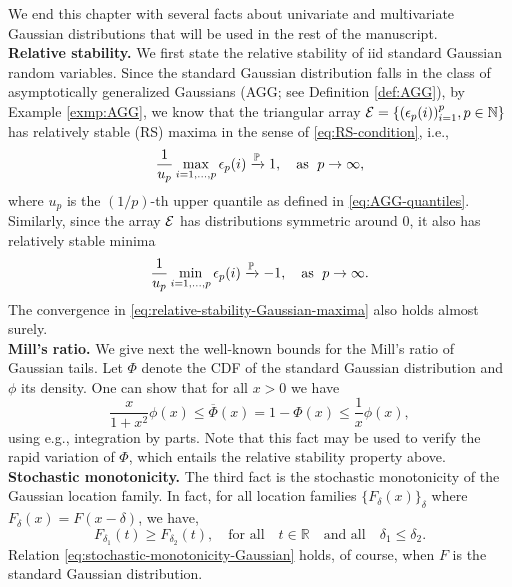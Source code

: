 
We end this chapter with several facts about univariate and multivariate Gaussian distributions that will be used in the rest of the manuscript. \\

{\bf Relative stability.} We first state the relative stability of iid standard Gaussian random variables.  Since the standard Gaussian distribution falls in the 
class of asymptotically generalized Gaussians (AGG; see Definition \ref{def:AGG}), by Example \ref{exmp:AGG}, we know that the triangular array ${\cal E} = \{(\epsilon_p(i))_{i=1}^p, p\in\N\}$ has relatively stable (RS) maxima in the sense of \eqref{eq:RS-condition}, i.e.,
\begin{equation} \label{eq:relative-stability-Gaussian-maxima}
    \frac{1}{u_{p}} \max_{i=1,\ldots,p} \epsilon_p(i) \xrightarrow{\P} 1,\quad \text{as }\;p\to\infty,
\end{equation}
where $u_p$ is the $(1/p)$-th upper quantile as defined in \eqref{eq:AGG-quantiles}.
Similarly, since the array ${\cal E}$ has distributions symmetric around 0, it also has relatively stable minima
\begin{equation} \label{eq:relative-stability-Gaussian-minima}
    \frac{1}{u_{p}} \min_{i=1,\ldots,p} \epsilon_p(i) \xrightarrow{\P} -1,\quad \text{as }\;p\to\infty.
\end{equation}
The convergence in \eqref{eq:relative-stability-Gaussian-maxima} also holds almost surely.\\

{\bf Mill's ratio.} We give next the well-known bounds for the Mill's ratio of Gaussian tails.
Let $\Phi$ denote the CDF of the standard Gaussian distribution and $\phi$ its density.
One can show that for all $x>0$ we have
\begin{equation} \label{eq:Mills-ratio}
    \frac{x}{1+x^2}\phi(x) \le \overline{\Phi}(x) = 1-\Phi(x) \le \frac{1}{x}\phi(x),
\end{equation}
using e.g., integration by parts.  Note that this fact may be used to verify the rapid variation of $\Phi$, which entails 
the relative stability property above.\\

{\bf Stochastic monotonicity.} The third fact is the stochastic monotonicity of the Gaussian location family. 
In fact, for all location families $\{F_\delta(x)\}_\delta$ where $F_\delta(x) = F(x-\delta)$, we have,
\begin{equation} \label{eq:stochastic-monotonicity-Gaussian}
    F_{\delta_1}(t) \ge F_{\delta_2}(t), \quad \text{for all}\quad t\in\mathbb{R}\quad\text{and all}\quad \delta_1 \le \delta_2.
\end{equation}
Relation \eqref{eq:stochastic-monotonicity-Gaussian} holds, of course, when $F$ is the standard Gaussian distribution. \\

